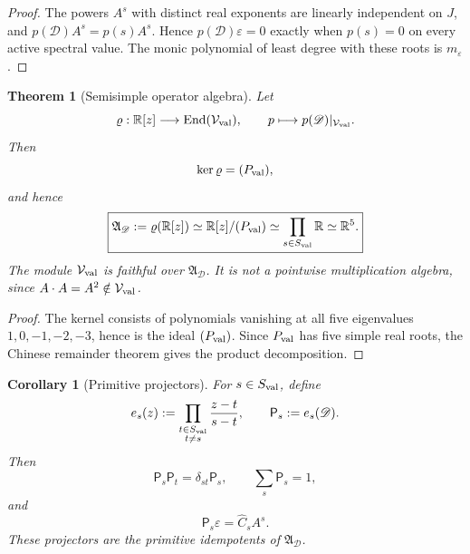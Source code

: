 \documentclass[aps,prd,preprint,onecolumn,nofootinbib,superscriptaddress,showkeys]{revtex4-2}
\numberwithin{equation}{section}
\theoremstyle{definition}
\theoremstyle{plain}
\newtheorem{theorem}{Theorem}[section]
\newtheorem{corollary}{Corollary}[section]
\newcommand{\R}{\mathbb R}
\newcommand{\Dil}{\mathscr D}
\begin{document}
\begin{proof}
The powers \(A^s\) with distinct real exponents are linearly independent on \(J\), and \(p(\Dil)A^s=p(s)A^s\).  Hence \(p(\Dil)\varepsilon=0\) exactly when \(p(s)=0\) on every active spectral value.  The monic polynomial of least degree with these roots is \(m_\varepsilon\).
\end{proof}

\begin{theorem}[Semisimple operator algebra]
Let
\begin{equation}
\varrho:\R[z]\longrightarrow\operatorname{End}(\mathcal V_{\rm val}),
\qquad
p\longmapsto p(\Dil)|_{\mathcal V_{\rm val}}.
\end{equation}
Then
\begin{equation}
\ker\varrho=(P_{\rm val}),
\end{equation}
and hence
\begin{equation}
\boxed{
\mathfrak A_{\Dil}
:=
\varrho(\R[z])
\simeq
\R[z]/(P_{\rm val})
\simeq
\prod_{s\in S_{\rm val}}\R
\simeq
\R^5.
}
\end{equation}
The module \(\mathcal V_{\rm val}\) is faithful over \(\mathfrak A_{\Dil}\).  It is not a pointwise multiplication algebra, since \(A\cdot A=A^2\notin\mathcal V_{\rm val}\).
\end{theorem}

\begin{proof}
The kernel consists of polynomials vanishing at all five eigenvalues \(1,0,-1,-2,-3\), hence is the ideal \((P_{\rm val})\).  Since \(P_{\rm val}\) has five simple real roots, the Chinese remainder theorem gives the product decomposition.
\end{proof}

\begin{corollary}[Primitive projectors]
For \(s\in S_{\rm val}\), define
\begin{equation}
e_s(z):=
\prod_{\substack{t\in S_{\rm val}\\t\ne s}}
\frac{z-t}{s-t},
\qquad
\mathsf P_s:=e_s(\Dil).
\end{equation}
Then
\begin{equation}
\mathsf P_s\mathsf P_t=\delta_{st}\mathsf P_s,
\qquad
\sum_s\mathsf P_s=1,
\end{equation}
and
\begin{equation}
\mathsf P_s\varepsilon=\widehat C_sA^s.
\end{equation}
These projectors are the primitive idempotents of \(\mathfrak A_{\Dil}\).
\end{corollary}
\end{document}

